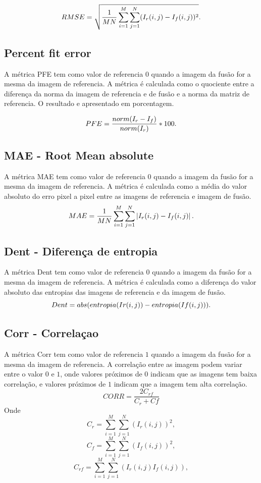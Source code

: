 \documentclass[conference]{IEEEtran}
\begin{document}
\begin{equation}
	RMSE=\sqrt{\frac{1}{MN}\sum_{i=1}^M\sum_{j=1}^N(I_r(i,j)-I_f(i,j))^2}.  \\
\end{equation}
\subsection{Percent fit error}
 A métrica PFE tem como valor de referencia $0$ quando a imagem da fusão for a mesma da imagem de referencia. A métrica é calculada como o quociente entre a diferença da norma da imagem de referencia e de fusão e a norma da matriz de referencia. O resultado e apresentado em porcentagem.

\begin{equation}
	PFE=\frac{norm(I_r-I_f)}{norm(I_r)}*100.  \\
\end{equation}

\subsection{MAE - Root Mean absolute}
 A métrica MAE tem como valor de referencia $0$ quando a imagem da fusão for a mesma da imagem de referencia. A métrica é calculada como a média do valor absoluto do erro pixel a pixel entre as imagens de referencia e imagem de fusão.
\begin{equation}
	MAE=\frac{1}{MN}\sum_{i=1}^M\sum_{j=1}^N\left|I_r(i,j)-I_f(i,j)\right|.  \\
\end{equation}
\subsection{Dent - Diferença de entropia}
A métrica Dent tem como valor de referencia $0$ quando a imagem da fusão for a mesma da imagem de referencia. A métrica é calculada como a diferença do valor absoluto  das entropias das imagens de referencia e da imagem de fusão.
\begin{equation}
	Dent=abs(entropia(Ir(i,j))-entropia(If(i,j))).  \\
\end{equation}

\subsection{Corr - Correlaçao}
A métrica Corr tem como valor de referencia $1$ quando a imagem da fusão for a mesma da imagem de referencia. A correlação entre as imagem podem variar entre o valor $0$ e $1$, onde valores próximos de $0$ indicam que as imagens tem baixa correlação, e valores próximos de $1$ indicam que a imagem tem alta correlação.
\begin{equation}
CORR = \frac{2C_{rf}}{C_r+Cf}
\end{equation}
Onde $$C_r= \sum_{i=1}^M\sum_{j=1}^N(I_r(i,j))^2,$$ $$C_f=\sum_{i=1}^M\sum_{j=1}^N(I_f(i,j))^2,$$ $$C_{rf}=\sum_{i=1}^M\sum_{j=1}^N(I_r(i,j)I_f(i,j)),$$
\end{document}
